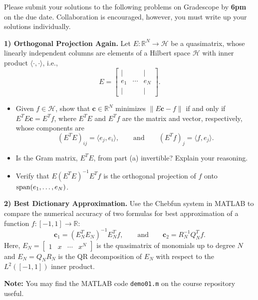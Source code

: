 \documentclass[12pt]{article}
\begin{document}
\noindent
Please submit your solutions to the following problems on Gradescope by \textbf{6pm} on the due date. Collaboration is encouraged, however, you must write up your solutions individually.

\bigskip

\noindent
\textbf{1) Orthogonal Projection Again.} Let $E:\mathbb{R}^N\rightarrow \mathcal{H}$ be a quasimatrix, whose linearly independent columns are elements of a Hilbert space $\mathcal{H}$ with inner product $\langle\cdot,\cdot\rangle$, i.e.,
$$
E = \begin{bmatrix}
| & & | \\
e_1 & \cdots & e_N \\
| & & |
\end{bmatrix}.
$$

\begin{itemize}

	\item[\textbf{(a)}] Given $f\in\mathcal{H}$, show that $\mathbf{c}\in\mathbb{R}^N$ minimizes $\|E\mathbf{c}-f\|$ if and only if $E^TE\mathbf{c}=E^Tf$, where $E^TE$ and  $E^Tf$ are the matrix and vector, respectively, whose components are
$$
(E^TE)_{ij} = \langle e_j, e_i\rangle, \qquad\text{and}\qquad (E^Tf)_j = \langle f, e_j\rangle.
$$


	\item[\textbf{(b)}] Is the Gram matrix, $E^TE$, from part (a) invertible? Explain your reasoning.

	\item[\textbf{(c)}] Verify that $E(E^TE)^{-1}E^Tf$ is the orthogonal projection of $f$ onto ${\rm span}(e_1,\ldots,e_N)$.

\end{itemize}

\bigskip

\noindent
\textbf{2) Best Dictionary Approximation.} Use the Chebfun system in MATLAB to compare the numerical accuracy of two formulas for best approximation of a function $f:[-1,1]\rightarrow\mathbb{R}$:
$$
\mathbf{c}_1 = (E_N^TE_N)^{-1}E_N^Tf, \qquad\text{and}\qquad \mathbf{c}_2 = R_N^{-1} Q_N^Tf.
$$
Here, $E_N = \begin{bmatrix} 1 & x & \cdots & x^N\end{bmatrix}$ is the quasimatrix of monomials up to degree $N$ and $E_N = Q_NR_N$ is the QR decomposition of $E_N$ with respect to the $L^2([-1,1])$ inner product.

\medskip
\noindent
\textbf{Note:} You may find the MATLAB code \texttt{demo01.m} on the course repository useful.
\end{document}

